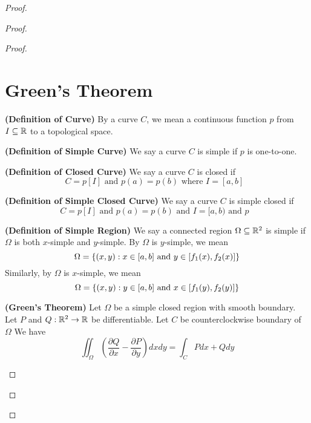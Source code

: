 \documentclass{report}
\begin{document}
\begin{proof}
\begin{proof}
\begin{proof}
\section{Green's Theorem}
\begin{definition}
\label{7.3.1}
\textbf{(Definition of Curve)} By a curve $C$, we mean a continuous function  $p$ from $I\subseteq \mathbb{R}$  to a topological space.
\end{definition}
\begin{definition}
\label{7.3.2}
\textbf{(Definition of Simple Curve)} We say a curve $C$ is simple if $p$ is one-to-one.
\end{definition}
\begin{definition}
\label{7.3.3}
\textbf{(Definition of Closed Curve)} We say a curve $C$ is closed if 
 \begin{equation}
C=p[I]\text{ and }p(a)=p(b)\text{ where $I=[a,b]$ }
\end{equation}
\end{definition}
\begin{definition}
\label{7.3.4}
\textbf{(Definition of Simple Closed Curve)} We say a curve $C$ is simple closed if 
 \begin{equation}
C=p[I]\text{ and }p(a)=p(b)\text{ and }I=[a,b)\text{ and }p\text{  }
\end{equation}
\end{definition}
\begin{definition}
\label{7.3.5}
\textbf{(Definition of Simple Region)} We say a connected region $\Omega\subseteq \mathbb{R}^2$ is simple if $\Omega$ is both $x$-simple and  $y$-simple. By $\Omega$ is $y$-simple, we mean 
 \begin{equation}
\Omega=\{ (x,y):x\in [a,b]\text{ and }y\in [f_1(x),f_2(x)] \}
\end{equation}
Similarly, by $\Omega$ is $x$-simple, we mean
 \begin{equation}
\Omega=\{ (x,y):y\in [a,b]\text{ and }x\in [f_1(y),f_2(y)] \}
\end{equation}
\end{definition}
\begin{theorem}
\label{7.3.6}
\textbf{(Green's Theorem)} Let $\Omega$ be a simple closed region with smooth boundary. Let $P$ and  $Q:\mathbb{R}^2\rightarrow \mathbb{R}$ be differentiable. Let $C$ be counterclockwise boundary of  $\Omega$ We have
\begin{equation}
\iint_{\Omega} \left(\frac{\partial Q}{\partial  x}-\frac{\partial P}{\partial y} \right) dxdy=\int_C Pdx+Qdy
\end{equation}

\end{theorem}
\end{proof}
\end{proof}
\end{proof}
\end{document}
